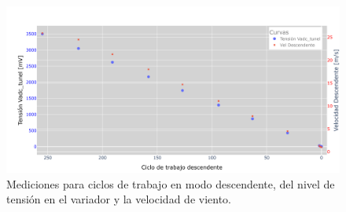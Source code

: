 
\begin{figure}[H]
    \centering
    \includegraphics[width=1\linewidth]{Figuras/datalogger/Hardware/MedicionesPWM/pruebaTunelCicloDes.png}
    \caption{Mediciones para ciclos de trabajo en modo descendente, del nivel de tensión en el variador y la velocidad de viento.}
    \label{fig:pruebaTunelCicloDes}
\end{figure}

